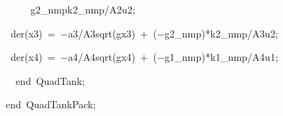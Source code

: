 {{\hlstd }{\hlstd\ \ \ \ \ }{\hlstd g2\_{}nmp}{\hlopt *}{\hlstd k2\_{}nmp}{\hlopt /}{\hlstd A2}{\hlopt *}{\hlstd u2}{\hlopt ;}\leavevmode\par
{\hlstd \ }{\hlkwb der}{\hlstd }{\hlopt (}{\hlstd x3}{\hlopt )\ $\mathord{=}$\ $\mathord{-}$}{\hlstd a3}{\hlopt /}{\hlstd A3}{\hlopt *}{\hlstd sqrt}{\hlopt (}{\hlstd }{}{\hlstd }{\hlopt *}{\hlstd g}{\hlopt *}{\hlstd x3}{\hlopt )\ $\mathord{+}$\ (}{\hlstd }{}{\hlstd }{\hlopt $\mathord{-}$}{\hlstd g2\_{}nmp}{\hlopt )*}{\hlstd k2\_{}nmp}{\hlopt /}{\hlstd A3}{\hlopt *}{\hlstd u2}{\hlopt ;}\leavevmode\par
{\hlstd \ }{\hlkwb der}{\hlstd }{\hlopt (}{\hlstd x4}{\hlopt )\ $\mathord{=}$\ $\mathord{-}$}{\hlstd a4}{\hlopt /}{\hlstd A4}{\hlopt *}{\hlstd sqrt}{\hlopt (}{\hlstd }{}{\hlstd }{\hlopt *}{\hlstd g}{\hlopt *}{\hlstd x4}{\hlopt )\ $\mathord{+}$\ (}{\hlstd }{}{\hlstd }{\hlopt $\mathord{-}$}{\hlstd g1\_{}nmp}{\hlopt )*}{\hlstd k1\_{}nmp}{\hlopt /}{\hlstd A4}{\hlopt *}{\hlstd u1}{\hlopt ;}\leavevmode\par
{\hlstd \leavevmode\par
}{\hlstd\ \ }{\hlstd }{\hlkwa end\ }{\hlstd QuadTank}{\hlopt ;}\leavevmode\par
{\hlstd }\leavevmode\par
{\hlkwa end\ }{\hlstd QuadTankPack}{\hlopt ;}{\hlstd }\leavevmode\par
}
\bye
